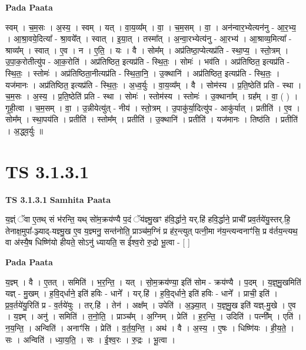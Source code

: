 \documentclass[17pt]{extarticle}
\begin{document}
\textbf{Pada Paata} \newline

स्वम् । च॒म॒सः । अ॒स्य॒ । स्वम् । यत् । वा॒य॒व्य᳚म् । वा॒ । च॒म॒सम् । वा॒ । अन॑न्वार॒भ्येत्यन॑नु - आ॒र॒भ्य॒ । आ॒श्रा॒वये॒दित्या᳚ - श्रा॒वये᳚त् । स्वात् । इ॒या॒त् । तस्मा᳚त् । अ॒न्वा॒रभ्येत्य॑नु - आ॒रभ्य॑ । आ॒श्राव्य॒मित्या᳚ - श्राव्य᳚म् । स्वात् । ए॒व । न । ए॒ति॒ । यः । वै । सोम᳚म् । अप्र॑तिष्ठा॒प्येत्यप्र॑ति - स्था॒प्य॒ । स्तो॒त्रम् । उ॒पा॒क॒रोतीत्यु॑प - आ॒क॒रोति॑ । अप्र॑तिष्ठित॒ इत्यप्र॑ति - स्थि॒तः॒ । सोमः॑ । भव॑ति । अप्र॑तिष्ठित॒ इत्यप्र॑ति - स्थि॒तः॒ । स्तोमः॑ । अप्र॑तिष्ठिता॒नीत्यप्र॑ति - स्थि॒ता॒नि॒ । उ॒क्थानि॑ । अप्र॑तिष्ठित॒ इत्यप्र॑ति - स्थि॒तः॒ । यज॑मानः । अप्र॑तिष्ठित॒ इत्यप्र॑ति - स्थि॒तः॒ । अ॒ध्व॒र्युः । वा॒य॒व्य᳚म् । वै । सोम॑स्य । प्र॒ति॒ष्ठेति॑ प्रति - स्था । च॒म॒सः । अ॒स्य॒ । प्र॒ति॒ष्ठेति॑ प्रति - स्था । सोमः॑ । स्तोम॑स्य । स्तोमः॑ । उ॒क्थाना᳚म् । ग्रह᳚म् । वा॒ ( ) । गृ॒ही॒त्वा । च॒म॒सम् । वा॒ । उ॒न्नीयेत्यु॑त् - नीय॑ । स्तो॒त्रम् । उ॒पाकु॑र्या॒दित्यु॑प - आकु॑र्यात् । प्रतीति॑ । ए॒व । सोम᳚म् । स्था॒पय॑ति । प्रतीति॑ । स्तोम᳚म् । प्रतीति॑ । उ॒क्थानि॑ । प्रतीति॑ । यज॑मानः । तिष्ठ॑ति । प्रतीति॑ । अ॒द्ध्व॒र्युः ॥  \newline




\section*{ TS 3.1.3.1 }

\textbf{TS 3.1.3.1 } \newline
\textbf{Samhita Paata} \newline

य॒ज्ञ्ं ॅवा ए॒तथ् सं भ॑रन्ति॒ यथ् सो॑म॒क्रय॑ण्यै प॒दं ॅय॑ज्ञ्मु॒खꣳ ह॑वि॒र्द्धाने॒ यर्.हि॑ हवि॒र्द्धाने॒ प्राची᳚ प्रव॒र्तये॑यु॒स्तर्.हि॒ तेनाक्ष॒मुपा᳚-ञ्ज्याद्-यज्ञ्मु॒ख ए॒व य॒ज्ञ्मनु॒ सन्त॑नोति॒ प्राञ्च॑म॒ग्निं प्र ह॑र॒न्त्युत् पत्नी॒मा न॑य॒न्त्यन्वनाꣳ॑सि॒ प्र व॑र्तय॒न्त्यथ॒ वा अ॑स्यै॒ष धिष्णि॑यो हीयते॒ सोऽनु॑ ध्यायति॒ स ई᳚श्व॒रो रु॒द्रो भू॒त्वा - [  ] \newline

\textbf{Pada Paata} \newline

य॒ज्ञ्म् । वै । ए॒तत् । समिति॑ । भ॒र॒न्ति॒ । यत् । सो॒म॒क्रय॑ण्या॒ इति॑ सोम - क्रय॑ण्यै । प॒दम् । य॒ज्ञ्॒मु॒खमिति॑ यज्ञ् - मु॒खम् । ह॒वि॒द्‌र्धाने॒ इति॑ हविः - धाने᳚ । यर्.हि॑ । ह॒वि॒द्‌र्धाने॒ इति॑ हविः - धाने᳚ । प्राची॒ इति॑ । प्र॒व॒र्तये॑यु॒रिति॑ प्र - व॒र्तये॑युः । तर्.हि॑ । तेन॑ । अक्ष᳚म् । उपेति॑ । अ॒ञ्ज्या॒त् । य॒ज्ञ्॒मु॒ख इति॑ यज्ञ्-मु॒खे । ए॒व । य॒ज्ञ्म् । अनु॑ । समिति॑ । त॒नो॒ति॒ । प्राञ्च᳚म् । अ॒ग्निम् । प्रेति॑ । ह॒र॒न्ति॒ । उदिति॑ । पत्नी᳚म् । एति॑ । न॒य॒न्ति॒ । अन्विति॑ । अनाꣳ॑सि । प्रेति॑ । व॒र्त॒य॒न्ति॒ । अथ॑ । वै । अ॒स्य॒ । ए॒षः । धिष्णि॑यः । ही॒य॒ते॒ । सः । अन्विति॑ । ध्या॒य॒ति॒ । सः । ई॒श्व॒रः । रु॒द्रः । भू॒त्वा ।  \newline
\end{document}
